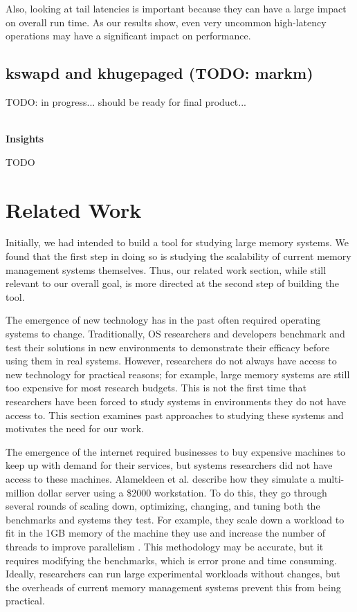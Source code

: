 \documentclass[twocolumn,11pt]{article}
\begin{document}

Also, looking at tail latencies is important because they can
have a large impact on overall run time. As our results show, even very uncommon
high-latency operations may have a significant impact on performance.


\subsection{kswapd and khugepaged (TODO: markm)}

TODO: in progress... should be ready for final product...

~\\ \textbf{Insights} 

TODO



\section{Related Work}

Initially, we had intended to build a tool for studying large memory systems.
We found that the first step in doing so is studying the scalability of current
memory management systems themselves. Thus, our related work section, while
still relevant to our overall goal, is more directed at the second step of
building the tool.

The emergence of new technology has in the past often required operating systems
to change. Traditionally, OS researchers and developers benchmark and test their
solutions in new environments to demonstrate their efficacy before using them in
real systems. However, researchers do not always have access to new technology
for practical reasons; for example, large memory systems are still too expensive
for most research budgets. This is not the first time that researchers have been
forced to study systems in environments they do not have access to. This section
examines past approaches to studying these systems and motivates the need for
our work.

The emergence of the internet required businesses to buy expensive machines to
keep up with demand for their services, but systems researchers did not have
access to these machines. Alameldeen et al. describe how they simulate a
multi-million dollar server using a \$2000 workstation. To do this, they go
through several rounds of scaling down, optimizing, changing, and tuning both
the benchmarks and systems they test. For example, they scale down a workload
to fit in the 1GB memory of the machine they use and increase the number of
threads to improve parallelism \cite{2kmachine}. This methodology may be
accurate, but it requires modifying the benchmarks, which is error prone and
time consuming.  Ideally, researchers can run large experimental workloads
without changes, but the overheads of current memory management systems prevent
this from being practical.
\end{document}
